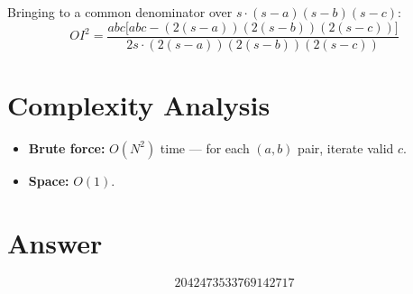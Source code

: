 \documentclass[11pt]{article}
\begin{document}
Bringing to a common denominator over $s \cdot (s-a)(s-b)(s-c)$:
\[
OI^2 = \frac{abc\bigl[abc - (2(s-a))(2(s-b))(2(s-c))\bigr]}{2s \cdot (2(s-a))(2(s-b))(2(s-c))}
\]

\section{Complexity Analysis}
\begin{itemize}
    \item \textbf{Brute force:} $O(N^2)$ time --- for each $(a, b)$ pair, iterate valid $c$.
    \item \textbf{Space:} $O(1)$.
\end{itemize}

\section{Answer}

\[
\boxed{2042473533769142717}
\]
\end{document}
